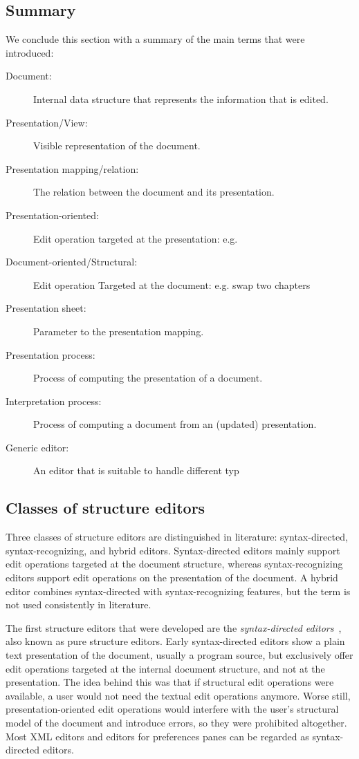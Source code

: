 \subsection{Summary}
We conclude this section with a summary of the main terms that were introduced:

\begin{description}
\item[Document:] Internal data structure that represents the information that is edited.
\item[Presentation/View:] Visible representation of the document. 
\item[Presentation mapping/relation:] The relation between the document and its presentation.
\item[Presentation-oriented:] Edit operation targeted at the presentation: e.g. \
\item[Document-oriented/Structural:] Edit operation Targeted at the document: e.g. swap two chapters 
\item[Presentation sheet:] Parameter to the presentation mapping. 
\item[Presentation process:] Process of computing the presentation of a document.
\item[Interpretation process:] Process of computing a document from an (updated) presentation.
\item[Generic editor:] An editor that is suitable to handle different typ
\end{description} 

%								
\subsection{Classes of structure editors}

Three classes of structure editors are distinguished in literature: syntax-directed, syntax-recognizing, and hybrid editors. Syntax-directed editors mainly support edit operations targeted at the document structure, whereas syntax-recognizing editors support edit operations on the presentation of the document. A hybrid editor combines  syntax-directed with syntax-recognizing features, but the term is not used consistently in literature. 

The first structure editors that were developed are the {\em syntax-directed editors}~\cite{reps84synGen,Bahlke86PSG,magnusson90orm}, also known as pure structure editors. Early syntax-directed editors show a plain text presentation of the document, usually a program source, but exclusively offer edit operations targeted at the internal document structure, and not at the presentation. The idea behind this was that if structural edit operations were available, a user would not need the textual edit operations anymore. Worse still, presentation-oriented edit operations would interfere with the user's structural model of the document and introduce errors, so they were prohibited altogether. Most XML editors and editors for preferences panes can be regarded as syntax-directed editors.

